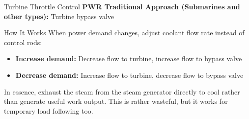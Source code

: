 \documentclass[aspectratio=169]{beamer}
\begin{document}
\begin{frame}[allowframebreaks]{Turbine Throttle Control}
	\textbf{PWR Traditional Approach (Submarines and other types):} 
	Turbine bypass valve \cite{zhang2024load}

    \vspace{1em}
    \begin{block}{How It Works}
        When power demand changes, adjust coolant flow rate instead of control rods:
        \begin{itemize}
			\item \textbf{Increase demand:} Decrease flow to turbine, increase flow to bypass valve
			\item \textbf{Decrease demand:} Increase flow to turbine, decrease flow to bypass valve
        \end{itemize}
    \end{block}

    \vspace{1em}
	In essence, exhaust the steam from the steam generator directly to cool 
	rather than generate useful work output. This is rather wasteful, but 
	it works for temporary load following too.
	
\end{frame}
\end{document}

